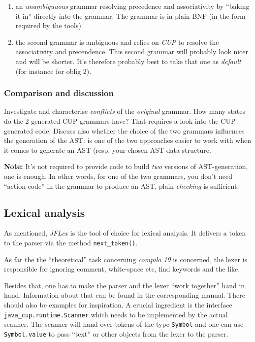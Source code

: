 \documentclass[10pt,freeform]{handout}[2014/08/13]
\begin{document}
\begin{enumerate}
\item an \emph{unambiguuous} grammar resolving precedence and associativity
  by ``baking it in'' directly into the grammar. The grammar is in plain
  BNF (in the form required by the tools)
\item the second grammar is ambiguous and relies on \emph{CUP} to resolve
  the associativity and precendence. This second grammar will probably look
  nicer and will be shorter. It's therefore probably best to take that one
  as \emph{default} (for instance for oblig 2).
\end{enumerate}

\subsubsection*{Comparison and discussion}
\label{sec:comparison}

Investigate and characterise \emph{conflicts} of the \emph{original}
grammar. How many states do the 2 generated CUP grammars have? That
requires a look into the CUP-generated code. Discuss also whether the
choice of the two grammars influences the generation of the AST: is one of
the two approaches easier to work with when it comes to generate an AST
(resp. your chosen AST data structure.


\textbf{Note:} It's not required to provide code to build \emph{two}
versions of AST-generation, one is enough. In other words, for one of the
two grammars, you don't need ``action code'' in the grammar to produce an
AST, plain \emph{checking} is sufficient.

\subsection{Lexical analysis}
\label{sec:lexical-analysis}

As mentioned, \textsl{JFLex} is the tool of choice for lexical analysis. It
delivers a token to the parser via the method \texttt{next\_token()}.  

As far the the ``theoretical'' task concerning \textsl{compila 19} is
concerned, the lexer is responsible for ignoring comment, white-space etc,
find keywords and the like. 

Besides that, one has to make the parser and the lexer ``work together''
hand in hand. Information about that can be found in the corresponding
manual. There should also be examples for inspiration. A crucial ingredient
is the interface \texttt{java\_cup.runtime.Scanner} which needs to be
implemented by the actual scanner. The scanner will hand over tokens of the
type \texttt{Symbol} and one can use \texttt{Symbol.value} to pass ``text''
or other objects from the lexer to the parser.
\end{document}
